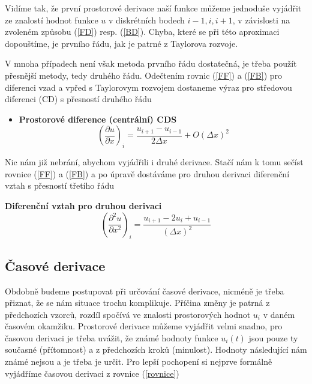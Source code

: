 Vidíme tak, že první prostorové derivace naší funkce můžeme jednoduše vyjádřit ze 
znalostí hodnot funkce $u$ v diskrétních bodech $i-1,i,i+1$, v závislosti na 
zvoleném způsobu (\ref{FD}) resp. (\ref{BD}). Chyba, které se při této aproximaci 
dopouštíme, je prvního řádu, jak je patrné z Taylorova rozvoje.

V mnoha případech není však metoda prvního řádu dostatečná, je třeba použít 
přesnější metody, tedy druhého řádu. Odečtením rovnic (\ref{FF}) a (\ref{FB}) pro 
diferenci vzad a vpřed s Taylorovym rozvojem dostaneme výraz pro středovou 
diferenci (CD) s přesností druhého řádu \\

\begin{tcolorbox}[title = Diference II.řádu - první derivace]
\begin{itemize}
\item{{\bf Prostorové diference (centrální) CDS}
\begin{equation}
  \left( \frac{\partial u}{\partial x}\right)_{i}
= \frac{u_{i+1}-u_{i-1}}{2\Delta x} + O(\Delta x)^2
\label{CD}
\end{equation}}
\end{itemize}
\end{tcolorbox}

Nic nám již nebrání, abychom vyjádřili i druhé derivace. Stačí nám k tomu sečíst 
rovnice (\ref{FF}) a (\ref{FB}) a po úpravě dostáváme pro druhou derivaci 
diferenční vztah s přesností třetího řádu

\begin{tcolorbox}[title = Diference I. řádu - druhá derivace]
{\bf Diferenční vztah pro druhou derivaci}
\begin{equation}
  \left( \frac{{\partial}^2 u}{\partial x^2}\right)_{i}
= \frac{u_{i+1} - 2 u_i + u_{i-1}}{(\Delta x)^2}
\label{SecDer}
\end{equation}
\end{tcolorbox}

\subsection*{Časové derivace}

Obdobně budeme postupovat při určování časové derivace, nicméně je třeba přiznat, 
že se nám situace trochu komplikuje. Příčina změny je patrná z předchozích vzorců, 
rozdíl spočívá ve znalosti prostorových hodnot $u_i$ v daném časovém okamžiku. 
Prostorové derivace můžeme vyjádřit velmi snadno, pro časovou derivaci je třeba 
uvážit, že známé hodnoty funkce $u_i(t)$ jsou pouze ty současné (přítomnost) a z 
předchozích kroků (minulost). Hodnoty následující nám známé nejsou a je třeba je 
určit. Pro lepší pochopení si nejprve formálně vyjádříme časovou derivaci z rovnice 
(\ref{rovnice})

